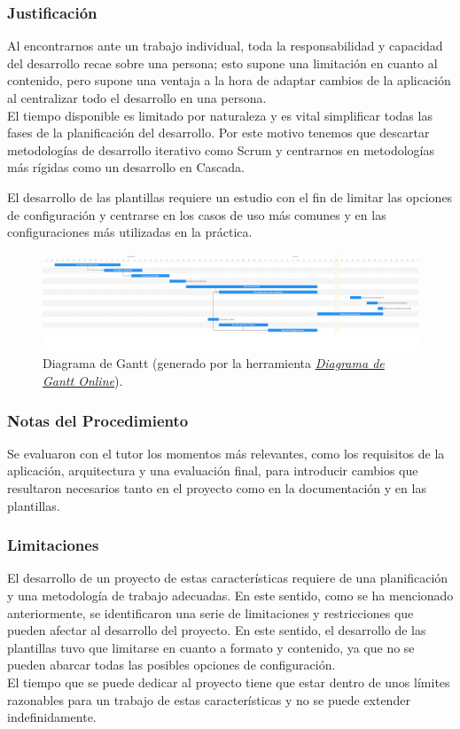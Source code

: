 \documentclass[12pt, a4paper, twoside]{article}
\begin{document}
\subsubsection{Justificación}
Al encontrarnos ante un trabajo individual, toda la responsabilidad y capacidad del desarrollo recae sobre una persona; esto supone una limitación en cuanto al contenido, pero supone una ventaja 
a la hora de adaptar cambios de la aplicación al centralizar todo el desarrollo en una persona. \\ 
El tiempo disponible es limitado por naturaleza y es vital simplificar todas las fases de la planificación del desarrollo. Por este motivo tenemos que descartar metodologías de desarrollo iterativo como Scrum y centrarnos en metodologías más rígidas como un desarrollo en Cascada.

El desarrollo de las plantillas requiere un estudio con el fin de limitar las opciones de configuración y centrarse en los casos de uso más comunes y en las configuraciones más utilizadas en la práctica.

\begin{figure}[ht]
	\centering
		\includegraphics[width=1\textwidth]{gantt.png} 
	\caption{Diagrama de Gantt (generado por la herramienta \href{https://www.plandemejora.com/crear-diagrama-de-gantt-online/}{\emph{Diagrama de Gantt Online}}).} 
\end{figure}

\subsubsection{Notas del Procedimiento}
Se evaluaron con el tutor los momentos más relevantes, como los requisitos de la aplicación, arquitectura y una evaluación final, para introducir cambios que resultaron necesarios tanto en el proyecto como en la documentación y en las plantillas.

\subsubsection{Limitaciones}
El desarrollo de un proyecto de estas características requiere de una planificación y una metodología de trabajo adecuadas.
En este sentido, como se ha mencionado anteriormente, se identificaron una serie de limitaciones y restricciones que pueden afectar al desarrollo del proyecto.
En este sentido, el desarrollo de las plantillas tuvo que limitarse en cuanto a formato y contenido, ya que no se pueden abarcar todas las posibles opciones de configuración.
\\El tiempo que se puede dedicar al proyecto tiene que estar dentro de unos límites razonables para un trabajo de estas características y no se puede extender indefinidamente.
\end{document}
